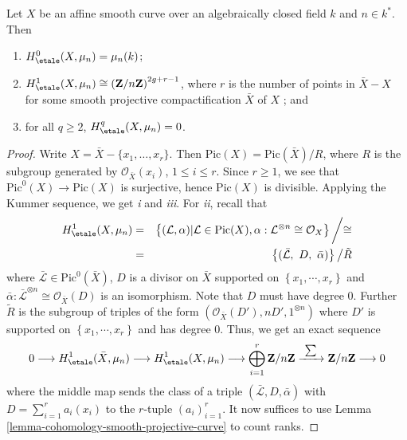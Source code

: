 \begin{lemma}
\label{lemma-vanishing-cohomology-mu-smooth-curve}
Let $X$ be an affine smooth curve over an algebraically closed field $k$ and
$n\in k^*$. Then
\begin{enumerate}
\item
$H_\etale^0(X, \mu_n) = \mu_n(k)$;
\item
$H_\etale^1(X, \mu_n) \cong
\left(\mathbf{Z}/n\mathbf{Z}\right)^{2g+r-1}$, where
$r$ is the number of points in $\bar X - X$ for some smooth projective
compactification $\bar X$ of $X$ ; and
\item
for all $q\geq 2$, $H_\etale^q(X, \mu_n) = 0$.
\end{enumerate}
\end{lemma}

\begin{proof}
Write $X = \bar X - \{ x_1, \dots, x_r\}$. Then $\text{Pic}(X) =
\text{Pic}(\bar X)/ R$, where $R$ is the subgroup generated by
$\mathcal{O}_{\bar X}(x_i)$, $1 \leq i \leq r$. Since $r \geq 1$, we see that
$\text{Pic}^0(X) \to \text{Pic}(X)$ is surjective, hence $\text{Pic}(X)$ is
divisible. Applying the Kummer sequence, we get {\it i} and {\it iii}. For {\it
ii}, recall that
\begin{eqnarray*}
H_\etale^1(X, \mu_n) & = &
\left\{
(\mathcal L, \alpha) | \mathcal L \in \text{Pic}(X),
\alpha: \mathcal{L}^{\otimes n} \cong \mathcal{O}_X
\right\}
{\bigg /} {\cong} \\
& = &
\left\{(\bar{\mathcal L}, \ D, \ \bar \alpha) \right\} {\big /} \tilde{R}
\end{eqnarray*}
where $\bar{\mathcal L} \in \text{Pic}^0(\bar X)$, $D$ is a divisor on $\bar X$
supported on $\left\{x_1, \cdots, x_r\right\}$ and $ \bar{\alpha}:
\bar{\mathcal L}^{\otimes n} \cong \mathcal{O}_{\bar{X}}(D)$ is an isomorphism.
Note that $D$ must have degree 0. Further $\tilde{R}$ is the subgroup of
triples of the form $(\mathcal{O}_{\bar X}(D'), n D', 1^{\otimes n})$ where
$D'$ is supported on $\left\{x_1, \cdots, x_r\right\}$ and has degree 0. Thus,
we get an exact sequence
$$
0 \longrightarrow
H_\etale^1(\bar X, \mu_n) \longrightarrow
H_\etale^1(X, \mu_n) \longrightarrow
\bigoplus_{i=1}^r \mathbf{Z}/n\mathbf{Z}
\xrightarrow{\ \sum\ }
\mathbf{Z}/n\mathbf{Z} \longrightarrow 0
$$
where the middle map sends the class of a triple $(\bar{ \mathcal L}, D, \bar
\alpha)$ with $D = \sum_{i=1}^r a_i (x_i)$ to the $r$-tuple $(a_i)_{i=1}^r$. It
now suffices to use
Lemma \ref{lemma-cohomology-smooth-projective-curve}
to count ranks.
\end{proof}

